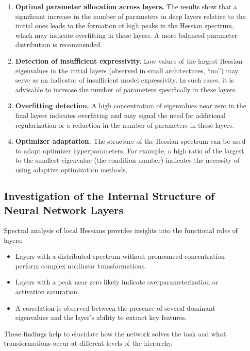\documentclass[a4paper,12pt]{article}
\begin{document}
\begin{enumerate}
  \item \textbf{Optimal parameter allocation across layers.} The results show that a significant increase in
    the number of parameters in deep layers relative to the initial ones leads to the formation of high peaks
    in the Hessian spectrum, which may indicate overfitting in these layers. A more balanced parameter
    distribution is recommended.
  \item \textbf{Detection of insufficient expressivity.} Low values of the largest Hessian eigenvalues in the
    initial layers (observed in small architectures, ``no'') may serve as an indicator of insufficient model
    expressivity. In such cases, it is advisable to increase the number of parameters specifically in these layers.
  \item \textbf{Overfitting detection.} A high concentration of eigenvalues near zero in the final layers
    indicates overfitting and may signal the need for additional regularization or a reduction in the number
    of parameters in these layers.
  \item \textbf{Optimizer adaptation.} The structure of the Hessian spectrum can be used to adapt optimizer
    hyperparameters. For example, a high ratio of the largest to the smallest eigenvalue (the condition
    number) indicates the necessity of using adaptive optimization methods.
\end{enumerate}

\subsection{Investigation of the Internal Structure of Neural Network Layers}

Spectral analysis of local Hessians provides insights into the functional roles of layers:
\begin{itemize}
  \item Layers with a distributed spectrum without pronounced concentration perform complex nonlinear transformations.
  \item Layers with a peak near zero likely indicate overparameterization or activation saturation.
  \item A correlation is observed between the presence of several dominant eigenvalues and the layer's
    ability to extract key features.
\end{itemize}

These findings help to elucidate how the network solves the task and what transformations occur at different
levels of the hierarchy.
\end{document}
